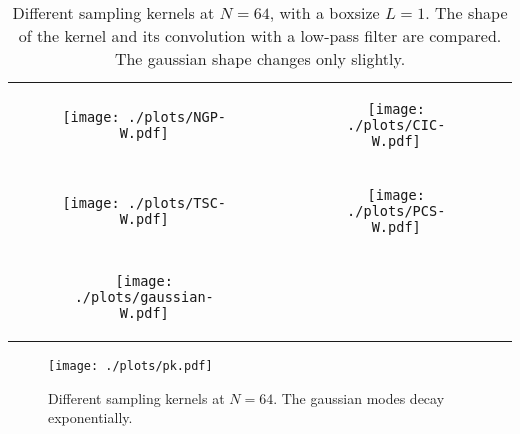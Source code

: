 {\centering%
\begin{table}
    \begin{tabular}{cc}
        \begin{subfigure}{.5\textwidth}
            \centering\texttt{[image: ./plots/NGP-W.pdf]}
        \end{subfigure} &
        \begin{subfigure}{.5\textwidth}
            \centering\texttt{[image: ./plots/CIC-W.pdf]}
        \end{subfigure} \\
        \begin{subfigure}{.5\textwidth}
            \centering\texttt{[image: ./plots/TSC-W.pdf]}
        \end{subfigure} &
        \begin{subfigure}{.5\textwidth}
            \centering\texttt{[image: ./plots/PCS-W.pdf]}
        \end{subfigure} \\
        \begin{subfigure}{.5\textwidth}
            \centering\texttt{[image: ./plots/gaussian-W.pdf]}
        \end{subfigure} &
        \begin{subfigure}{.5\textwidth}
        \end{subfigure} \\
    \end{tabular}
    \caption{Different sampling kernels at $N=64$, with a boxsize $L=1$.
    The shape of the kernel and its convolution with a low-pass filter
    are compared. The gaussian shape changes only slightly.}
    \label{tab:wfilters}
\end{table}
}
\begin{figure}
    \centering\texttt{[image: ./plots/pk.pdf]}
    \caption{Different sampling kernels at $N=64$. The gaussian
    modes decay exponentially.}
    \label{fig:pk}
\end{figure}


